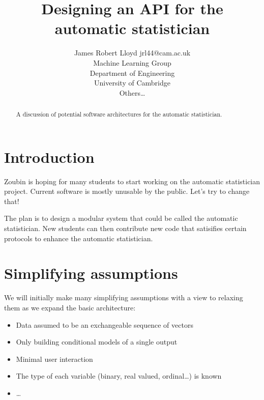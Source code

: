 \documentclass[twoside,11pt]{article}
\begin{document}
\lstset{language=Lisp,basicstyle=\ttfamily\footnotesize} 

\title{Designing an API for the automatic statistician}

\author{\name James Robert Lloyd \email jrl44@cam.ac.uk \\
       \addr 
       Machine Learning Group \\
       Department of Engineering\\
       University of Cambridge\\
       \AND
       \name Others\dots}


\maketitle

\begin{abstract}
A discussion of potential software architectures for the automatic statistician.
\end{abstract}


\section{Introduction}

Zoubin is hoping for many students to start working on the automatic statistician project.
Current software is mostly unusable by the public.
Let's try to change that!

The plan is to design a modular system that could be called the automatic statistician.
New students can then contribute new code that satisifies certain protocols to enhance the automatic statistician.

\section{Simplifying assumptions}

We will initially make many simplifying assumptions with a view to relaxing them as we expand the basic architecture:

\begin{itemize}
  \item Data assumed to be an exchangeable sequence of vectors
  \item Only building conditional models of a single output
  \item Minimal user interaction
  \item The type of each variable (\eg binary, real valued, ordinal\dots) is known
  \item \dots
\end{itemize}
\end{document}
